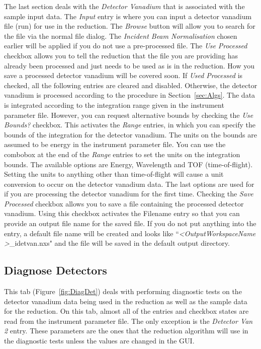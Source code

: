 The last section deals with the \textit{Detector Vanadium} that is associated with the sample input data. The \textit{Input} entry is where you can input a detector vanadium file (run) for use in the reduction. The \textit{Browse} button will allow you to search for the file via the normal file dialog. The \textit{Incident Beam Normalisation} chosen earlier will be applied if you do not use a pre-processed file. The \textit{Use Processed} checkbox allows you to tell the reduction that the file you are providing has already been processed and just needs to be used as is in the reduction. How you save a processed detector vanadium will be covered soon. If \textit{Used Processed} is checked, all the following entries are cleared and disabled. Otherwise, the detector vanadium is processed according to the procedure in Section~\ref{sec:Algs}. The data is integrated according to the integration range given in the instrument parameter file. However, you can request alternative bounds by checking the \textit{Use Bounds?} checkbox. This activates the \textit{Range} entries, in which you can specify the bounds of the integration for the detector vanadium. The units on the bounds are assumed to be energy in the instrument parameter file. You can use the combobox at the end of the \textit{Range} entries to set the units on the integration bounds. The available options are Energy, Wavelength and TOF (time-of-flight). Setting the units to anything other than time-of-flight will cause a unit conversion to occur on the detector vanadium data. The last options are used for if you are processing the detector vanadium for the first time. Checking the \textit{Save Processed} checkbox allows you to save a \nexus{} file containing the processed detector vanadium. Using this checkbox activates the Filename entry so that you can provide an output file name for the saved file. If you do not put anything into the entry, a default file name will be created and looks like ``\textit{\textless OutputWorkspaceName \textgreater}\_idetvan.nxs" and the file will be saved in the \mantid{} default output directory. 
\subsection{Diagnose Detectors}\label{sec:UI-DiagDet}
This tab (Figure~\ref{fig:DiagDet}) deals with performing diagnostic tests on the detector vanadium data being used in the reduction as well as the sample data for the reduction. On this tab, almost all of the entries and checkbox states are read from the instrument parameter file. The only exception is the \textit{Detector Van 2} entry. These parameters are the ones that the reduction algorithm will use in the diagnostic tests unless the values are changed in the GUI. 

